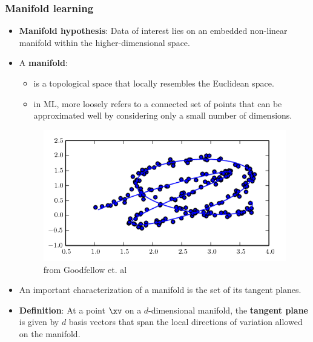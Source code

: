 
 








\begin{vbframe}
\frametitle{Manifold learning}

  \begin{itemize}
        \item \textbf{Manifold hypothesis}: 
        Data of interest lies on an embedded non-linear manifold within the higher-dimensional space.
        \item A \textbf{manifold}: 
        \begin{itemize}
        \item  is a topological space that locally resembles the Euclidean space.
        \item  in ML, more loosely refers to a connected set of points that can be approximated well by considering only a small number of dimensions. %
        \end{itemize}
          \begin{figure}[h]
                \centering
                \includegraphics[width=5  cm]{plots/manifold.png}
                \caption{
                from Goodfellow et. al%
                }
            \end{figure}
           \end{itemize}    
       \framebreak
 
\begin{itemize}
    \item An important characterization of a manifold is the set of its tangent planes.
    \item \textbf{Definition}: At a point $\xv$ on a $d$-dimensional manifold, the \textbf{tangent plane} is given by $d$ basis vectors that span the local directions of variation allowed on the manifold.
    

\end{itemize}
\end{vbframe}
